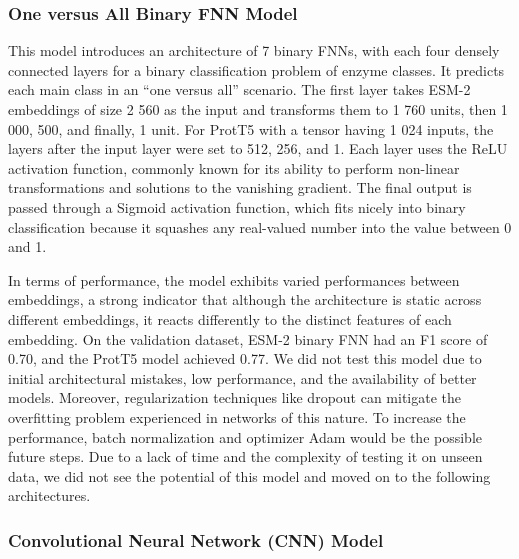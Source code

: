 \documentclass{bioinfo}
\begin{document}
\subsubsection{One versus All Binary FNN Model}
This model introduces an architecture of 7 binary FNNs, with each four densely connected layers for a binary classification problem of enzyme classes. It predicts each main class in an ``one versus all'' scenario.
The first layer takes ESM-2 embeddings of size 2 560 as the input and transforms them to 1 760 units, then 1 000, 500, and finally, 1 unit. For ProtT5 with a tensor having 1 024 inputs, the layers after the input layer were set to 512, 256, and 1.
Each layer uses the ReLU activation function, commonly known for its ability to perform non-linear transformations and solutions to the vanishing gradient.
The final output is passed through a Sigmoid activation function, which fits nicely into binary classification because it squashes any real-valued number into the value between 0 and 1. 

In terms of performance, the model exhibits varied performances between embeddings, a strong indicator that although the architecture is static across different embeddings, it reacts differently to the distinct features of each embedding.
On the validation dataset, ESM-2 binary FNN had an F1 score of 0.70, and the ProtT5 model achieved 0.77. We did not test this model due to initial architectural mistakes, low performance, and the availability of better models.
Moreover, regularization techniques like dropout can mitigate the overfitting problem experienced in networks of this nature. To increase the performance, batch normalization and optimizer Adam would be the possible future steps. Due to a lack of time and the complexity of testing it on unseen data, we did not see the potential of this model and moved on to the following architectures.

\subsubsection{Convolutional Neural Network (CNN) Model}
\end{document}
